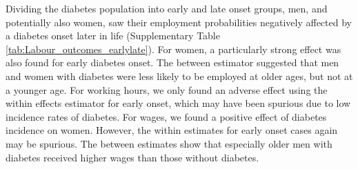 \documentclass[12pt,english]{article}
\begin{document}
Dividing the diabetes population into early and late onset groups, men, and potentially also women, saw their employment probabilities negatively affected by a diabetes onset later in life (Supplementary Table \ref{tab:Labour_outcomes_earlylate}). For women, a particularly strong effect was also found for early diabetes onset. The between estimator suggested that men and women with diabetes were less likely to be employed at older ages, but not at a younger age. For working hours, we only found an adverse effect using the within effects estimator for early onset, which may have been spurious due to low incidence rates of diabetes. For wages, we found a positive effect of diabetes incidence on women. However, the within estimates for early onset cases again may be spurious. The between estimates show that especially older men with diabetes received higher wages than those without diabetes. 
\end{document}
